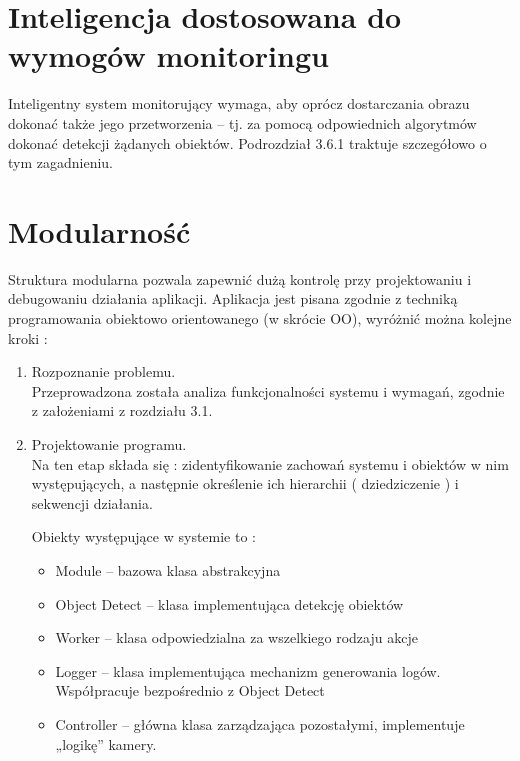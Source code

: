 \section{Inteligencja dostosowana do wymogów monitoringu}
Inteligentny system monitorujący wymaga, aby oprócz dostarczania obrazu dokonać także jego przetworzenia – tj. za pomocą odpowiednich algorytmów dokonać detekcji żądanych obiektów.
Podrozdział 3.6.1 traktuje szczegółowo o tym zagadnieniu.

\section{Modularność }

\begin{description}
\item Struktura modularna pozwala zapewnić dużą kontrolę przy projektowaniu i debugowaniu działania aplikacji. Aplikacja jest pisana zgodnie z techniką programowania obiektowo orientowanego (w skrócie OO), wyróżnić można kolejne kroki :
\begin{enumerate}[noitemsep]
\item Rozpoznanie problemu. \\%
Przeprowadzona została analiza funkcjonalności systemu i wymagań, zgodnie z założeniami z rozdziału 3.1.
\item Projektowanie programu. \\
Na ten etap składa się : zidentyfikowanie zachowań systemu i obiektów w nim występujących, a następnie określenie ich hierarchii ( dziedziczenie ) i sekwencji działania.



Obiekty występujące w systemie to :
\begin{itemize}[noitemsep]
\item Module – bazowa klasa abstrakcyjna
\item Object Detect – klasa implementująca detekcję obiektów
\item Worker – klasa odpowiedzialna za wszelkiego rodzaju akcje
\item Logger – klasa implementująca mechanizm generowania logów. Współpracuje bezpośrednio z Object Detect
\item Controller – główna klasa zarządzająca pozostałymi, implementuje „logikę” kamery.
\end{itemize}


\end{enumerate}
\end{description}
